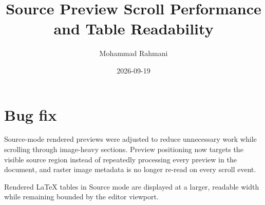 \documentclass[a4paper]{article}
\title{Source Preview Scroll Performance and Table Readability}
\date{2026-09-19}
\author{Mohammad Rahmani}
\begin{document}
\maketitle

\section{Bug fix}

Source-mode rendered previews were adjusted to reduce unnecessary work while scrolling through image-heavy sections. Preview positioning now targets the visible source region instead of repeatedly processing every preview in the document, and raster image metadata is no longer re-read on every scroll event.

Rendered LaTeX tables in Source mode are displayed at a larger, readable width while remaining bounded by the editor viewport.
\end{document}
